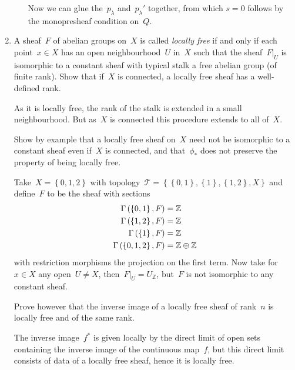 \documentclass[a4paper,11pt,oneside,openany,article]{memoir}
\begin{document}
\begin{enumerate}
\begin{enumerate}
\begin{solution}
          Now we can glue the~$p_\lambda$ and~$p_\lambda'$ together, from which $s=0$ follows by the monopresheaf condition on~$Q$.
        \end{solution}
    \end{enumerate}

  \item A sheaf~$F$ of abelian groups on~$X$ is called \emph{locally free} if and only if each point~$x\in X$ has an open neighbourhood~$U$ in~$X$ such that the sheaf~$F|_U$ is isomorphic to a constant sheaf with typical stalk a free abelian group (of finite rank). Show that if~$X$ is connected, a locally free sheaf has a well-defined rank.

    \begin{solution}
      As it is locally free, the rank of the stalk is extended in a small neighbourhood. But as~$X$ is connected this procedure extends to all of~$X$.
    \end{solution}

    Show by example that a locally free sheaf on~$X$ need not be isomorphic to a constant sheaf even if~$X$ is connected, and that~$\phi_*$ does not preserve the property of being locally free.

    \begin{solution}
      Take~$X=\left\{ 0,1,2 \right\}$ with topology~$\mathcal{T}=\left\{ \left\{ 0,1 \right\},\left\{ 1 \right\},\left\{ 1,2 \right\},X \right\}$ and define~$F$ to be the sheaf with sections
      \begin{align}
        \mathrm{\Gamma}\left( \left\{ 0,1 \right\},F \right)&=\mathbb{Z} \\
        \mathrm{\Gamma}\left( \left\{ 1,2 \right\},F \right)&=\mathbb{Z} \\
        \mathrm{\Gamma}\left( \left\{ 1 \right\},F \right)&=\mathbb{Z} \\
        \mathrm{\Gamma}\left( \left\{ 0,1,2 \right\},F \right)&=\mathbb{Z}\oplus\mathbb{Z}
      \end{align}
      with restriction morphisms the projection on the first term. Now take for~$x\in X$ any open~$U\neq X$, then~$F|_U=U_\mathbb{Z}$, but~$F$ is not isomorphic to any constant sheaf.
    \end{solution}

    Prove however that the inverse image of a locally free sheaf of rank~$n$ is locally free and of the same rank.

    \begin{solution}
      The inverse image~$f^*$ is given locally by the direct limit of open sets containing the inverse image of the continuous map~$f$, but this direct limit consists of data of a locally free sheaf, hence it is locally free.
    \end{solution}
\end{enumerate}
\end{document}
